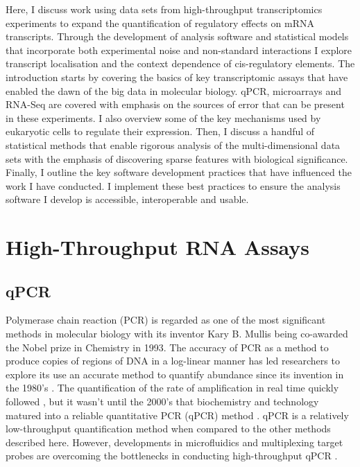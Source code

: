 \documentclass[../main.tex]{subfiles}
\begin{document}
Here, I discuss work using data sets from high-throughput transcriptomics experiments to expand the quantification of regulatory effects on mRNA transcripts. 
Through the development of analysis software and statistical models that incorporate both experimental noise and non-standard interactions I explore transcript localisation and the context dependence of cis-regulatory elements. 
The introduction starts by covering the basics of key transcriptomic assays that have enabled the dawn of the big data in molecular biology. 
qPCR, microarrays and RNA-Seq are covered with emphasis on the sources of error that can be present in these experiments. 
I also overview some of the key mechanisms used by eukaryotic cells to regulate their expression.
Then, I discuss a handful of statistical methods that enable rigorous analysis of the multi-dimensional data sets with the emphasis of discovering sparse features with biological significance. 
Finally, I outline the key software development practices that have influenced the work I have conducted. 
I implement these best practices to ensure the analysis software I develop is accessible, interoperable and usable.

\newpage

\section{High-Throughput RNA Assays}

\subsection{qPCR}

Polymerase chain reaction (PCR) is regarded as one of the most significant methods in molecular biology with its inventor Kary B. Mullis being co-awarded the Nobel prize in Chemistry in 1993.
The accuracy of PCR as a method to produce copies of regions of DNA in a log-linear manner has led researchers to explore its use an accurate method to quantify abundance since its invention in the 1980's \parencite{Saiki1988}.
The quantification of the rate of amplification in real time quickly followed \parencite{Holland1991}, but it wasn't until the 2000's that biochemistry and technology matured into a reliable quantitative PCR (qPCR) method \parencite{Walker2002}.
qPCR is a relatively low-throughput quantification method when compared to the other methods described here.
However, developments in microfluidics and multiplexing target probes are overcoming the bottlenecks in conducting high-throughput qPCR \parencite{Dreier2022}.
\end{document}
